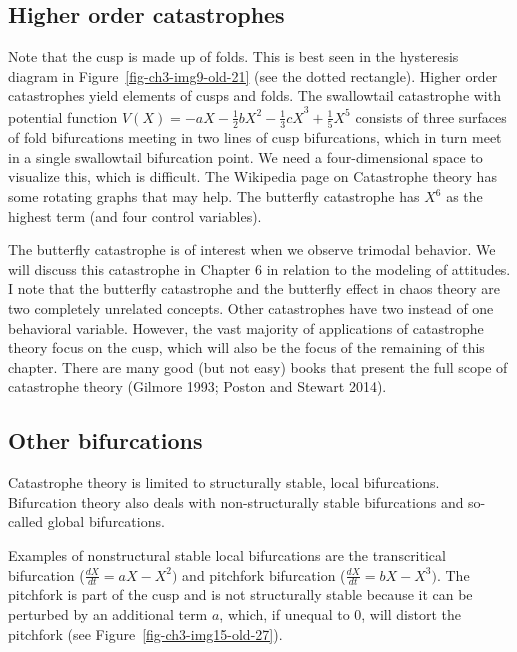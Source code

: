 \documentclass[
  letterpaper,
]{scrbook}
\begin{document}
\hypertarget{higher-order-catastrophes}{%
\subsection{Higher order catastrophes}\label{higher-order-catastrophes}}

Note that the cusp is made up of folds. This is best seen in the
hysteresis diagram in Figure~\ref{fig-ch3-img9-old-21} (see the dotted
rectangle). Higher order catastrophes yield elements of cusps and folds.
The swallowtail catastrophe with potential function
\(V(X) = {- aX - \frac{1}{2}bX^{2} - \frac{1}{3}cX}^{3} + \frac{1}{5}X^{5}\)
consists of three surfaces of fold bifurcations meeting in two lines of
cusp bifurcations, which in turn meet in a single swallowtail
bifurcation point. We need a four-dimensional space to visualize this,
which is difficult. The Wikipedia page on Catastrophe theory has some
rotating graphs that may help. The butterfly catastrophe has \(X^{6}\)
as the highest term (and four control variables).

The butterfly catastrophe is of interest when we observe trimodal
behavior. We will discuss this catastrophe in Chapter 6 in relation to
the modeling of attitudes. I note that the butterfly catastrophe and the
butterfly effect in chaos theory are two completely unrelated concepts.
Other catastrophes have two instead of one behavioral variable. However,
the vast majority of applications of catastrophe theory focus on the
cusp, which will also be the focus of the remaining of this chapter.
There are many good (but not easy) books that present the full scope of
catastrophe theory (Gilmore 1993; Poston and Stewart 2014).

\hypertarget{other-bifurcations}{%
\subsection{Other bifurcations}\label{other-bifurcations}}

Catastrophe theory is limited to structurally stable, local
bifurcations. Bifurcation theory also deals with non-structurally stable
bifurcations and so-called global bifurcations.

Examples of nonstructural stable local bifurcations are the
transcritical bifurcation (\(\frac{dX}{dt} = aX - X^{2})\) and pitchfork
bifurcation (\(\frac{dX}{dt} = bX - X^{3})\). The pitchfork is part of
the cusp and is not structurally stable because it can be perturbed by
an additional term \(a\), which, if unequal to 0, will distort the
pitchfork (see Figure~\ref{fig-ch3-img15-old-27}).
\end{document}

